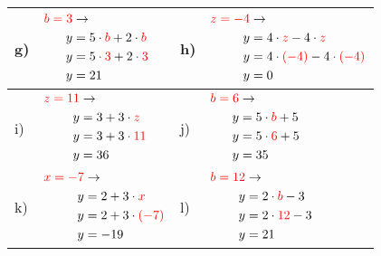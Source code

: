 \documentclass[12pt]{article}
\begin{document}
\begin{xltabular}{\textwidth}{|C{0.75cm}|X|C{0.75cm}|X|}
\\\hline
g)&$\begin{aligned}
\textcolor{red}{b=3} & \rightarrow\\
y&=5 \cdot \textcolor{red}{b} + 2 \cdot \textcolor{red}{b}\\
y&=5 \cdot \textcolor{red}{3} + 2 \cdot \textcolor{red}{3}\\
y&=21\\
\end{aligned}$
&
h)&$\begin{aligned}
\textcolor{red}{z=-4} & \rightarrow\\
y&=4 \cdot \textcolor{red}{z} - 4 \cdot \textcolor{red}{z}\\
y&=4 \cdot \textcolor{red}{(-4)} - 4 \cdot \textcolor{red}{(-4)}\\
y&=0\\
\end{aligned}$
\\\hline
i)&$\begin{aligned}
\textcolor{red}{z=11} & \rightarrow\\
y&=3 + 3 \cdot \textcolor{red}{z}\\
y&=3 + 3 \cdot \textcolor{red}{11}\\
y&=36\\
\end{aligned}$
&
j)&$\begin{aligned}
\textcolor{red}{b=6} & \rightarrow\\
y&=5 \cdot \textcolor{red}{b} + 5\\
y&=5 \cdot \textcolor{red}{6} + 5\\
y&=35\\
\end{aligned}$
\\\hline
k)&$\begin{aligned}
\textcolor{red}{x=-7} & \rightarrow\\
y&=2 + 3 \cdot \textcolor{red}{x}\\
y&=2 + 3 \cdot \textcolor{red}{(-7)}\\
y&=-19\\
\end{aligned}$
&
l)&$\begin{aligned}
\textcolor{red}{b=12} & \rightarrow\\
y&=2 \cdot \textcolor{red}{b} - 3\\
y&=2 \cdot \textcolor{red}{12} - 3\\
y&=21\\
\end{aligned}$

\end{xltabular}
\end{document}
